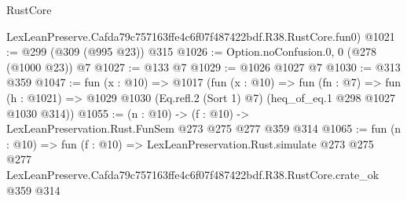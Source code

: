 \begin{lexlean}{RustCore}
\begin{coremodule}
    LexLeanPreserve.Cafda79c757163ffe4c6f07f487422bdf.R38.RustCore.fun0)
@1021 := @299 (@309 (@995 @23)) @315
@1026 := Option.noConfusion.{0, 0} (@278 (@1000 @23)) @7
@1027 := @133 @7
@1029 := @1026 @1027 @7
@1030 := @313 @359
@1047 := fun (x : @10) =>
  @1017
    (fun (x : @10) =>
    fun (fn : @7) =>
    fun (h : @1021) => @1029 @1030 (Eq.refl.{2} (Sort 1) @7) (heq_of_eq.{1} @298 @1027 @1030 @314))
@1055 := (n : @10) -> (f : @10) -> LexLeanPreservation.Rust.FunSem @273 @275 @277 @359 @314
@1065 := fun (n : @10) =>
  fun (f : @10) =>
  LexLeanPreservation.Rust.simulate
    @273
    @275
    @277
    LexLeanPreserve.Cafda79c757163ffe4c6f07f487422bdf.R38.RustCore.crate_ok
    @359
    @314
\end{coremodule}
\end{lexlean}
